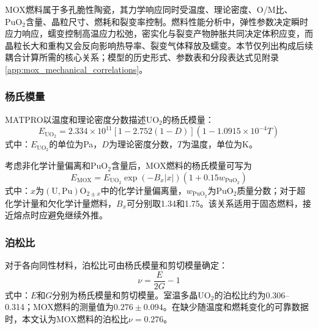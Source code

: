 \label{sec:mox_mechanical_properties}

MOX燃料属于多孔脆性陶瓷，其力学响应同时受温度、理论密度、O/M比、$\mathrm{PuO}_2$含量、晶粒尺寸、燃耗和裂变率控制。燃料性能分析中，弹性参数决定瞬时应力响应，蠕变控制高温应力松弛，密实化与裂变产物肿胀共同决定体积应变，而晶粒长大和重构又会反向影响热导率、裂变气体释放及蠕变。本节仅列出构成后续耦合计算所需的核心关系；模型的历史形式、参数表和分段表达式见附录\ref{app:mox_mechanical_correlations}。


\subsubsection{杨氏模量}

MATPRO以温度和理论密度分数描述$\mathrm{UO}_2$的杨氏模量：
\begin{equation}
	E_{\mathrm{UO}_2}
	=2.334\times10^{11}
	\left[1-2.752(1-D)\right]
	\left(1-1.0915\times10^{-4}T\right)
	\label{eq:uo2_youngs_modulus}
\end{equation}
式中：$E_{\mathrm{UO}_2}$的单位为Pa，$D$为理论密度分数，$T$为温度，单位为K。

考虑非化学计量偏离和$\mathrm{PuO}_2$含量后，MOX燃料的杨氏模量可写为
\begin{equation}
	E_{\mathrm{MOX}}
	=E_{\mathrm{UO}_2}\exp(-B_x|x|)
	\left(1+0.15w_{\mathrm{PuO}_2}\right)
	\label{eq:mox_youngs_modulus}
\end{equation}
式中：$x$为$(\mathrm{U},\mathrm{Pu})\mathrm{O}_{2\pm x}$中的化学计量偏离量，$w_{\mathrm{PuO}_2}$为$\mathrm{PuO}_2$质量分数；对于超化学计量和欠化学计量燃料，$B_x$可分别取1.34和1.75。该关系适用于固态燃料，接近熔点时应避免继续外推。

\subsubsection{泊松比}

对于各向同性材料，泊松比可由杨氏模量和剪切模量确定：
\begin{equation}
	\nu=\frac{E}{2G}-1
	\label{eq:mox_poisson_ratio}
\end{equation}
式中：$E$和$G$分别为杨氏模量和剪切模量。室温多晶$\mathrm{UO}_2$的泊松比约为0.306--0.314；MOX燃料的测量值为$0.276\pm0.094$。在缺少随温度和燃耗变化的可靠数据时，本文认为MOX燃料的泊松比$\nu=0.276$。


